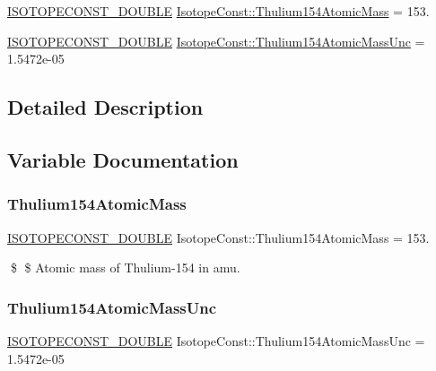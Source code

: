 \begin{DoxyCompactItemize}
\item 
\mbox{\hyperlink{group___isotope_const-_macros_ga8f45a7272ce02c0b4c65c44636ed719a}{I\+S\+O\+T\+O\+P\+E\+C\+O\+N\+S\+T\+\_\+\+D\+O\+U\+B\+LE}} \mbox{\hyperlink{group___isotope_const-_thulium-_tm154_ga1e764cfa9a2a0e1567aee928d140d341}{Isotope\+Const\+::\+Thulium154\+Atomic\+Mass}} = 153.
\item 
\mbox{\hyperlink{group___isotope_const-_macros_ga8f45a7272ce02c0b4c65c44636ed719a}{I\+S\+O\+T\+O\+P\+E\+C\+O\+N\+S\+T\+\_\+\+D\+O\+U\+B\+LE}} \mbox{\hyperlink{group___isotope_const-_thulium-_tm154_gaed20fc8ff50d6b959dd076de569c6600}{Isotope\+Const\+::\+Thulium154\+Atomic\+Mass\+Unc}} = 1.\+5472e-\/05
\end{DoxyCompactItemize}


\subsection{Detailed Description}


\subsection{Variable Documentation}
\mbox{\label{group___isotope_const-_thulium-_tm154_ga1e764cfa9a2a0e1567aee928d140d341}} 
\subsubsection{\texorpdfstring{Thulium154\+Atomic\+Mass}{Thulium154AtomicMass}}
{\footnotesize\ttfamily \mbox{\hyperlink{group___isotope_const-_macros_ga8f45a7272ce02c0b4c65c44636ed719a}{I\+S\+O\+T\+O\+P\+E\+C\+O\+N\+S\+T\+\_\+\+D\+O\+U\+B\+LE}} Isotope\+Const\+::\+Thulium154\+Atomic\+Mass = 153.}

\$ \$ Atomic mass of Thulium-\/154 in amu. \mbox{\label{group___isotope_const-_thulium-_tm154_gaed20fc8ff50d6b959dd076de569c6600}} 
\subsubsection{\texorpdfstring{Thulium154\+Atomic\+Mass\+Unc}{Thulium154AtomicMassUnc}}
{\footnotesize\ttfamily \mbox{\hyperlink{group___isotope_const-_macros_ga8f45a7272ce02c0b4c65c44636ed719a}{I\+S\+O\+T\+O\+P\+E\+C\+O\+N\+S\+T\+\_\+\+D\+O\+U\+B\+LE}} Isotope\+Const\+::\+Thulium154\+Atomic\+Mass\+Unc = 1.\+5472e-\/05}


